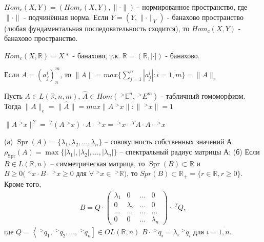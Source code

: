 \documentclass[__main__.tex]{subfiles}
\begin{document}
\begin{statement}
  $Hom_c(X,Y) = (Hom_c(X,Y), \lVert \cdot \rVert)$ - нормированное пространство, где $\lVert \cdot \rVert$ - подчинённая норма. Если  $Y = (Y, \lVert \cdot \rVert_Y)$ - банахово пространство (любая фундаментальная последовательность сходится), то $Hom_c(X,Y)$ - банахово пространство.
\end{statement}

\begin{statement}
  $Hom_c(X, \mathbb{R}) = X*$ - банахово, т.к. $\mathbb{R} = (\mathbb{R}, | \cdot |)$ - банахово.
\end{statement}

\begin{statement}
  Если $A = (a^i_j)^m_n$, то $\lVert A \rVert = max \lbrace \sum_{j=1}^{n}| a^i_j | : i=\overline{1,m} \rbrace = \lVert A \rVert_r$
\end{statement}

Пусть $A \in L(\mathbb{R},n,m)$, $\hat{A} \in Hom(\;^{>}\mathbb{E}^n, \;^{>}E^m)$ - табличный гомоморфизм. Тогда $\lVert A \rVert_e  = \lVert \hat{A} \rVert = max {\lVert A \;^{>}x \rVert : \lVert \;^{>}x \rVert = 1}$

$\lVert A \;^{>}x \rVert^2 = \;^{T}(A \;^{>}x) \cdot A \cdot \;^{>}x = \;^{>}x \cdot \;^{T}A \cdot A \cdot \;^{>}x$

\begin{definition}
  \begin{itemize}
    (а)
    $\operatorname{Spr}(A)=\{\lambda_1,\lambda_2,\dots,\lambda_n\}$ -- совокупность собственных значений А. $\rho_{\operatorname{Spr}}(A)=\operatorname{max}\{|\lambda_1|,|\lambda_2|,\dots,|\lambda_n|\}$ -- спектральный радиус матрицы А;
    (б)
    Если $B\in L(\mathbb{R},n)$ -- симметрическая матрица, то $\operatorname{Spr}(B)\subset\mathbb{R}$ и $B \geqslant 0 (\;^{<}x \cdot B \cdot \;^{>}x \geqslant 0$ для $\forall \;^{>}x \in \;^{>} \mathbb{R})$, то $Spr(B) \subset \mathbb{R}_+ = \lbrace r \in \mathbb{R}, r \geqslant 0 \rbrace$. Кроме того,
    \begin{gather*}
    B = Q \cdot \left(
    \begin{matrix}
        \lambda_1 & 0         & ... & 0         \\
        0         & \lambda_2 & ... & 0         \\
        ...       & ...       & ... & ...       \\
        0         & 0         & ... & \lambda_n
      \end{matrix}
    \right) \cdot \;^{T}Q,
    \end{gather*}
    где $Q = \left< \;^{>}q_1, \;^{>}q_2, ... , \;^{>}q_n \right] \in OL(\mathbb{R},n)$
    $B \cdot \;^{>}q_i = \lambda_i \;^{>}q_i$ для $i=\overline{1,n}$.
  \end{itemize}
\end{definition}
\end{document}
